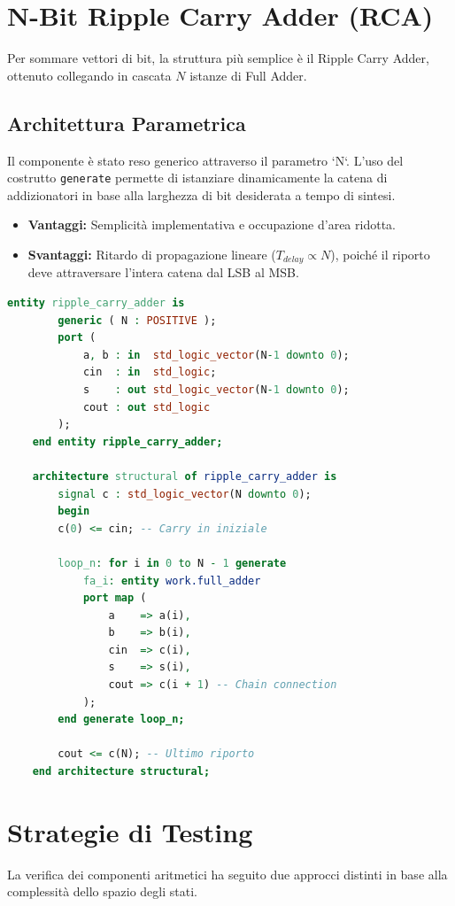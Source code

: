 \section{N-Bit Ripple Carry Adder (RCA)}
Per sommare vettori di bit, la struttura più semplice è il Ripple Carry Adder, ottenuto collegando in cascata $N$ istanze di Full Adder.



\subsection{Architettura Parametrica}
Il componente è stato reso generico attraverso il parametro `N`. L'uso del costrutto \texttt{generate} permette di istanziare dinamicamente la catena di addizionatori in base alla larghezza di bit desiderata a tempo di sintesi.

\begin{itemize}
	\item \textbf{Vantaggi:} Semplicità implementativa e occupazione d'area ridotta.
	\item \textbf{Svantaggi:} Ritardo di propagazione lineare ($T_{delay} \propto N$), poiché il riporto deve attraversare l'intera catena dal LSB al MSB.
\end{itemize}

\begin{lstlisting}[language=VHDL, caption={Ripple Carry Adder parametrico}, label={lst:rca}]
	entity ripple_carry_adder is
		generic ( N : POSITIVE ); 
		port ( 
			a, b : in  std_logic_vector(N-1 downto 0);
			cin  : in  std_logic;
			s    : out std_logic_vector(N-1 downto 0);
			cout : out std_logic
		);
	end entity ripple_carry_adder;
	
	architecture structural of ripple_carry_adder is
		signal c : std_logic_vector(N downto 0);
		begin
		c(0) <= cin; -- Carry in iniziale
	
		loop_n: for i in 0 to N - 1 generate
			fa_i: entity work.full_adder
			port map (
				a    => a(i),
				b    => b(i),
				cin  => c(i),
				s    => s(i),
				cout => c(i + 1) -- Chain connection
			);
		end generate loop_n;
	
		cout <= c(N); -- Ultimo riporto
	end architecture structural;
\end{lstlisting}

\section{Strategie di Testing}
La verifica dei componenti aritmetici ha seguito due approcci distinti in base alla complessità dello spazio degli stati.

